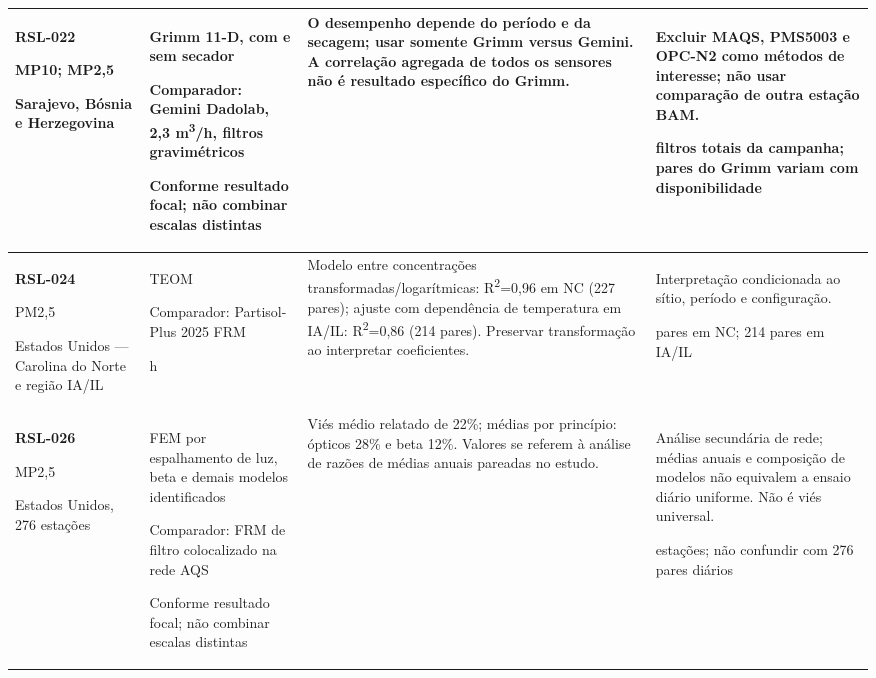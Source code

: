 \begin{longtable}{|P{0.18\textwidth}|P{0.25\textwidth}|P{0.28\textwidth}|P{\arrayrulewidth\relax}|}
\textbf{RSL-022}\par\textcite{rsl022}\par MP10; MP2,5\par Sarajevo, Bósnia e Herzegovina & Grimm 11-D, com e sem secador\par\medskip Comparador: Gemini Dadolab, 2,3 m\textsuperscript{3}/h, filtros gravimétricos\par\medskip Conforme resultado focal; não combinar escalas distintas & O desempenho depende do período e da secagem; usar somente Grimm versus Gemini. A correlação agregada de todos os sensores não é resultado específico do Grimm. & Excluir MAQS, PMS5003 e OPC-N2 como métodos de interesse; não usar comparação de outra estação BAM.\par{} filtros totais da campanha; pares do Grimm variam com disponibilidade\\\hline
\textbf{RSL-024}\par\textcite{rsl024}\par PM2,5\par Estados Unidos --- Carolina do Norte e região IA/IL & TEOM\par\medskip Comparador: Partisol-Plus 2025 FRM\par{} h & Modelo entre concentrações transformadas/logarítmicas: R\textsuperscript{2}=0,96 em NC (227 pares); ajuste com dependência de temperatura em IA/IL: R\textsuperscript{2}=0,86 (214 pares). Preservar transformação ao interpretar coeficientes. & Interpretação condicionada ao sítio, período e configuração.\par{} pares em NC; 214 pares em IA/IL\\\hline
\textbf{RSL-026}\par\textcite{rsl026}\par MP2,5\par Estados Unidos, 276 estações & FEM por espalhamento de luz, beta e demais modelos identificados\par\medskip Comparador: FRM de filtro colocalizado na rede AQS\par\medskip Conforme resultado focal; não combinar escalas distintas & Viés médio relatado de 22\%; médias por princípio: ópticos 28\% e beta 12\%. Valores se referem à análise de razões de médias anuais pareadas no estudo. & Análise secundária de rede; médias anuais e composição de modelos não equivalem a ensaio diário uniforme. Não é viés universal.\par{} estações; não confundir com 276 pares diários\\\hline

\end{longtable}
